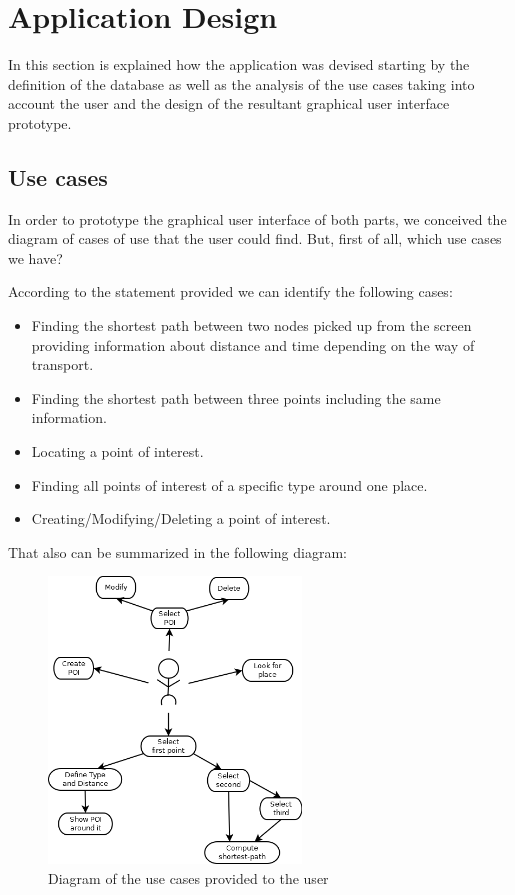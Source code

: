 \documentclass{article}
\begin{document}
\clearpage
\section{Application Design}
In this section is explained how the application was devised starting by the definition of the database as well as the analysis of the use cases taking into account the user and the design of the resultant graphical user interface prototype.

\subsection{Use cases} \label{use_cases}
In order to prototype the graphical user interface of both parts, we conceived the diagram of cases of use that the user could find. But, first of all, which use cases we have?

According to the statement provided we can identify the following cases:

\begin{itemize}
  \item Finding the shortest path between two nodes picked up from the screen providing information about distance and time depending on the way of transport.
  \item Finding the shortest path between three points including the same information.
  \item Locating a point of interest.
  \item Finding all points of interest of a specific type around one place.
  \item Creating/Modifying/Deleting a point of interest.
\end{itemize}

That also can be summarized in the following diagram:

\begin{figure}[h]
\centering
\includegraphics[width=0.6\textwidth]{use_cases.png}
\caption{Diagram of the use cases provided to the user}
\end{figure}
\end{document}
